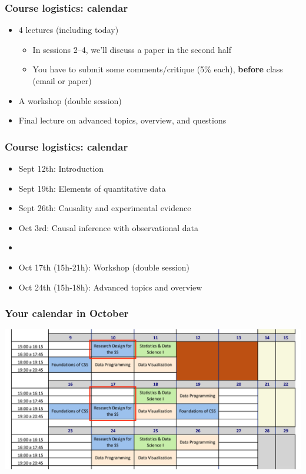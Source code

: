 \documentclass[aspectratio=43]{beamer}
\begin{document}
\begin{frame}
\frametitle{Course logistics: calendar}
\centering

\begin{itemize}
  \item 4 lectures (including today)
  \begin{itemize}
    \item In sessions 2--4, we'll discuss a paper in the second half
    \item You have to submit some comments/critique (5\% each), \textbf{before} class (email or paper)
  \end{itemize}
  \item A workshop (double session)
  \item Final lecture on advanced topics, overview, and questions
\end{itemize}

\end{frame}

\begin{frame}
\frametitle{Course logistics: calendar}
\centering

\begin{itemize}
  \item Sept 12th: Introduction
  \item Sept 19th: Elements of quantitative data
  \item Sept 26th: Causality and experimental evidence
  \item Oct 3rd: Causal inference with observational data
  \item {}
  \item Oct 17th (15h-21h): Workshop (double session)
  \item Oct 24th (15h-18h): Advanced topics and overview
\end{itemize}

\end{frame}

\begin{frame}
\frametitle{Your calendar in October}
\centering

\includegraphics[width = \textwidth]{../img/calendar}

\end{frame}
\end{document}

